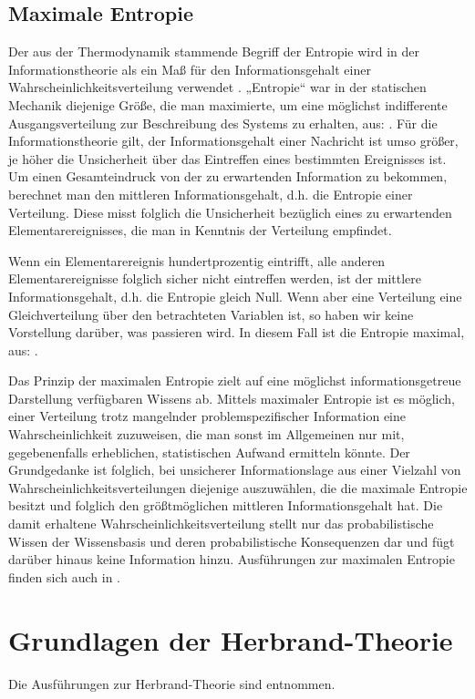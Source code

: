 \documentclass[draft]{scrreprt}
\begin{document}
{\section{Maximale Entropie} 
\label{MaxEnt}
Der aus der Thermodynamik stammende Begriff der Entropie wird in der Informationstheorie als ein Maß für den Informationsgehalt einer Wahrscheinlichkeitsverteilung verwendet \cite{RKI97}.
„Entropie“ war in der statischen Mechanik diejenige Größe, die man maximierte, um eine möglichst indifferente Ausgangsverteilung zur Beschreibung des Systems zu erhalten, aus: \cite{BKI08}.
Für die Informationstheorie gilt, der Informationsgehalt einer Nachricht ist umso größer, je höher die Unsicherheit über das Eintreffen eines bestimmten Ereignisses ist. Um einen Gesamteindruck von der zu erwartenden Information zu bekommen, berechnet man den mittleren Informationsgehalt, d.h. die Entropie einer Verteilung. Diese misst folglich die Unsicherheit bezüglich eines zu erwartenden Elementarereignisses, die man in Kenntnis der Verteilung empfindet.

Wenn ein Elementarereignis hundertprozentig eintrifft, alle anderen Elementarereignisse folglich sicher nicht eintreffen werden, ist der mittlere Informationsgehalt, d.h. die Entropie gleich Null. Wenn aber eine Verteilung eine Gleichverteilung über den betrachteten Variablen ist, so haben wir keine Vorstellung darüber, was passieren wird. In diesem Fall ist die Entropie maximal, aus: \cite{BKI08}.

Das Prinzip der maximalen Entropie zielt auf eine möglichst informationsgetreue Darstellung verfügbaren Wissens ab. Mittels maximaler Entropie ist es möglich, einer Verteilung trotz mangelnder problemspezifischer Information eine Wahrscheinlichkeit zuzuweisen, die man sonst im Allgemeinen nur mit, gegebenenfalls erheblichen, statistischen Aufwand ermitteln könnte. Der Grundgedanke ist folglich, bei unsicherer Informationslage aus einer Vielzahl von Wahrscheinlichkeitsverteilungen diejenige auszuwählen, die die maximale Entropie besitzt und folglich den größtmöglichen mittleren Informationsgehalt hat. Die damit erhaltene Wahrscheinlichkeitsverteilung stellt nur das probabilistische Wissen der Wissensbasis und deren probabilistische Konsequenzen dar und fügt darüber hinaus keine Information hinzu.
Ausführungen zur maximalen Entropie finden sich auch in \cite{TFLKIB10}.

\chapter{Grundlagen der Herbrand-Theorie}
\label{Herb}
Die Ausführungen zur Herbrand-Theorie sind \cite{BKI08} entnommen.

}
\end{document}
